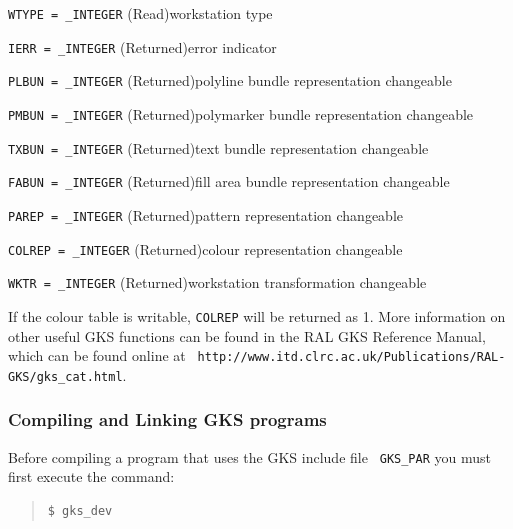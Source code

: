 \documentclass[twoside,11pt]{article}
\newcommand{\htmladdnormallink}[2]{#1}
\newcommand{\latex}[1]{#1}
\begin{document}
\begin{description}
\item {\tt WTYPE = \_INTEGER} (Read)\newline workstation type
\item {\tt IERR = \_INTEGER} (Returned)\newline error indicator
\item {\tt PLBUN = \_INTEGER} (Returned)\newline polyline bundle representation changeable
\item {\tt PMBUN = \_INTEGER} (Returned)\newline polymarker bundle representation changeable
\item {\tt TXBUN = \_INTEGER} (Returned)\newline text bundle representation changeable
\item {\tt FABUN = \_INTEGER} (Returned)\newline fill area bundle representation changeable
\item {\tt PAREP = \_INTEGER} (Returned)\newline pattern representation changeable
\item {\tt COLREP = \_INTEGER} (Returned)\newline colour representation changeable
\item {\tt WKTR = \_INTEGER} (Returned)\newline workstation transformation changeable
\end{description}

If the colour table is writable, {\tt COLREP} will be returned as 1.
More information on other useful GKS functions can be found in the
\htmladdnormallink{RAL GKS Reference
Manual}{http://www.itd.clrc.ac.uk/Publications/RAL-GKS/gks_cat.html}\latex{,
which can be found online at {\tt
http://www.itd.clrc.ac.uk/Publications/RAL-GKS/gks\_cat.html}}.

\subsubsection{Compiling and Linking GKS programs}

Before compiling a program that uses the GKS include file {\tt
GKS\_PAR} you must first execute the command: 

\small
\begin{quote}
\begin{verbatim}
$ gks_dev 
\end{verbatim}
\end{quote}
\normalsize
\end{document}
